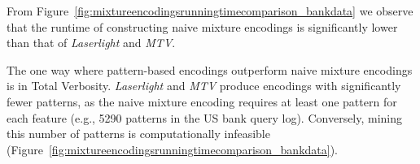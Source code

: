 From Figure~\ref{fig:mixtureencodingsrunningtimecomparison_bankdata} we observe that the runtime of constructing naive mixture encodings is significantly lower than that of \textit{Laserlight} and \textit{MTV}.

The one way where pattern-based encodings outperform naive mixture encodings is in Total Verbosity. 
\textit{Laserlight} and \textit{MTV} produce encodings with significantly fewer patterns, as the naive mixture encoding requires at least one pattern for each feature (e.g., 5290 patterns in the US bank query log).
Conversely, mining this number of patterns is computationally infeasible (Figure~\ref{fig:mixtureencodingsrunningtimecomparison_bankdata}).




